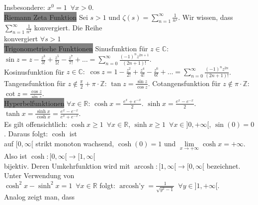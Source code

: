 \documentclass[10pt]{article}
\begin{document}
        \indent Insbesondere: $x^0=1\enspace\forall x>0$.\\
\colorbox{gray}{Riemann Zeta Funktion} Sei $s>1$ und 
                $\zeta(s)=\sum_{n=1}^\infty\frac{1}{n^s}$.
                Wir wissen, dass
                $\sum_{n=1}^\infty\frac{1}{n^2}$ konvergiert.
                Die Reihe \\
        \indent konvergiert $\forall s>1$\\
\colorbox{gray}{Trigonometrische Funktionen} Sinusfunktion für $z\in\mathbb{C}:$
                $\sin z=z-\frac{z^3}{3!}+\frac{z^5}{5!}-\frac{z^7}{7!}+\dots
                =\sum_{n=0}^\infty\frac{(-1)^nz^{2n+1}}{(2n+1)!}$.\\
        \indent Kosinusfunktion für $z\in\mathbb{C}:$
                $\cos z=1-\frac{z^2}{2!}+\frac{z^4}{4!}-\frac{z^6}{6!}+\dots
                =\sum_{n=0}^\infty\frac{(-1)^nz^{2n}}{(2n+1)!}$.\\
        \indent Tangensfunktion für $z\notin\frac{\pi}{2}+\pi\cdot\mathbb{Z}$:
                $\tan z=\frac{\sin z}{\cos z}$. \quad
                Cotangensfunktion für $z\notin\pi\cdot\mathbb{Z}$:
                $\cot z=\frac{\cos z}{\sin z}$.\\
\colorbox{gray}{Hyperbelfunktionen} $\forall x\in\mathbb{R}$:\quad
                $\cosh x=\frac{e^x+e^{-x}}{2}$.\quad
                $\sinh x=\frac{e^x-e^{-x}}{2}$.\quad
                $\tanh x=\frac{\sinh x}{\cosh x}=\frac{e^x-e^{-x}}{e^x+e^{-x}}$.\\
        \indent Es gilt offensichtlich:
                $\cosh x\geqslant1\enspace\forall x\in\mathbb{R}$,
                $\sinh x\geqslant1\enspace\forall x\in]0,+\infty[$,
                $\sin(0)=0$. Daraus folgt: $\cosh$ ist \\
        \indent auf $[0,\infty[$ strikt
                monoton wachsend, $\cosh(0)=1$ und
                $\lim\limits_{x\to+\infty}\cosh x=+\infty$. Also ist
                $\cosh:[0,\infty[\longrightarrow[1,\infty[$ \\
        \indent bijektiv. Deren Umkehrfunktion wird mit 
                $\operatorname{arcosh}:[1,\infty[\longrightarrow[0,\infty[$ 
                bezeichnet. Unter Verwendung von\\
        \indent $\cosh^2x-\sinh^2x=1\enspace\forall x\in\mathbb{R}$ 
                folgt:
                $\operatorname{arcosh'y}
                =\frac{1}{\sqrt{y^2-1}}\enspace\forall y\in]1,+\infty[$.\\
        \indent Analog zeigt man, dass 
\end{document}
